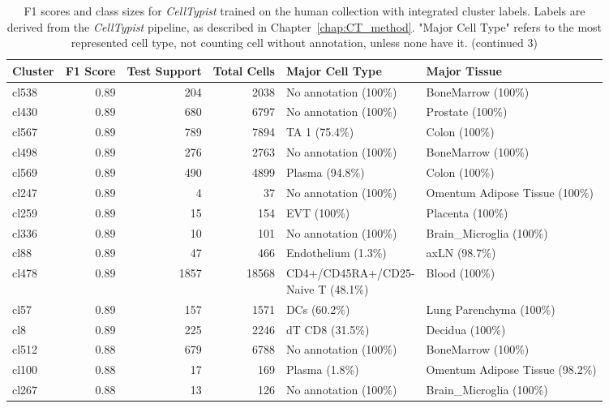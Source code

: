 \begin{table}[ht!]
\scriptsize
\caption[F1 scores and class sizes for \textit{CellTypist} trained on the human collection with integrated cluster labels (continued 3)]{F1 scores and class sizes for \textit{CellTypist} trained on the human collection with integrated cluster labels. Labels are derived from the \textit{CellTypist} pipeline, as described in Chapter~\ref{chap:CT_method}. "Major Cell Type" refers to the most represented cell type, not counting cell without annotation, unless none have it. (continued 3)}
\centering
\label{table:tab_HAmodelclust3}
\begin{tabular}{lrrrll}
  \toprule
Cluster & F1 Score & Test Support & Total Cells & Major Cell Type & Major Tissue \\ 
  \midrule 
  cl538 & 0.89 & 204 & 2038 & No annotation (100\%) & BoneMarrow (100\%) \\ 
  cl430 & 0.89 & 680 & 6797 & No annotation (100\%) & Prostate (100\%) \\ 
  cl567 & 0.89 & 789 & 7894 & TA 1 (75.4\%) & Colon (100\%) \\ 
  cl498 & 0.89 & 276 & 2763 & No annotation (100\%) & BoneMarrow (100\%) \\ 
  cl569 & 0.89 & 490 & 4899 & Plasma (94.8\%) & Colon (100\%) \\ 
  cl247 & 0.89 &   4 &  37 & No annotation (100\%) & Omentum Adipose Tissue (100\%) \\ 
  cl259 & 0.89 &  15 & 154 & EVT (100\%) & Placenta (100\%) \\ 
  cl336 & 0.89 &  10 & 101 & No annotation (100\%) & Brain\_Microglia (100\%) \\ 
  cl88 & 0.89 &  47 & 466 & Endothelium (1.3\%) & axLN (98.7\%) \\ 
  cl478 & 0.89 & 1857 & 18568 & \specialcell[t]{CD4+/CD45RA+/CD25-\\Naive T (48.1\%)} & Blood (100\%) \\ 
  cl57 & 0.89 & 157 & 1571 & DCs (60.2\%) & Lung Parenchyma (100\%) \\ 
  cl8 & 0.89 & 225 & 2246 & dT CD8 (31.5\%) & Decidua (100\%) \\ 
  cl512 & 0.88 & 679 & 6788 & No annotation (100\%) & BoneMarrow (100\%) \\ 
  cl100 & 0.88 &  17 & 169 & Plasma (1.8\%) & Omentum Adipose Tissue (98.2\%) \\ 
  cl267 & 0.88 &  13 & 126 & No annotation (100\%) & Brain\_Microglia (100\%) \\ 

\end{tabular}
\end{table}
